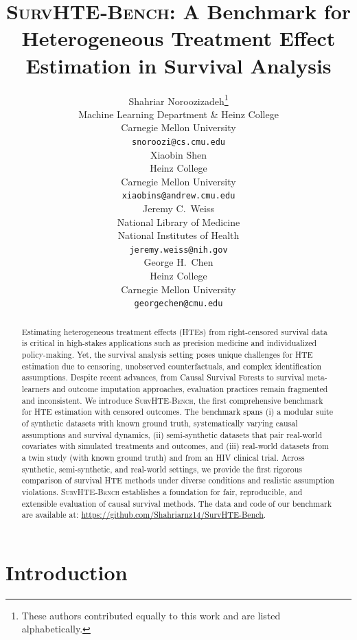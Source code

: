 \documentclass{article} %
\title{\textsc{SurvHTE‐Bench}: A Benchmark for \\ Heterogeneous Treatment Effect Estimation in Survival Analysis}
\author{Shahriar Noroozizadeh\thanks{These authors contributed equally to this work and are listed alphabetically.} \\
Machine Learning Department \& Heinz College \\
Carnegie Mellon University\\
\texttt{snoroozi@cs.cmu.edu} \\
\And
\hspace{-13.56em}Xiaobin Shen\footnotemark[1] \\
\hspace{-13.56em}Heinz College \\
\hspace{-13.56em}Carnegie Mellon University \\
\hspace{-13.56em}\texttt{xiaobins@andrew.cmu.edu}\\
\AND
Jeremy C.~Weiss \\
National Library of Medicine \\
National Institutes of Health \\
\texttt{jeremy.weiss@nih.gov}\\
\And
\hspace{12em}George H.~Chen \\
\hspace{12em}Heinz College \\
\hspace{12em}Carnegie Mellon University \\
\hspace{12em}\texttt{georgechen@cmu.edu}
}
\begin{document}
\maketitle

\begin{abstract}
\vspace{-.5em}
Estimating heterogeneous treatment effects (HTEs) from right-censored survival data is critical in high-stakes applications such as precision medicine and individualized policy-making. Yet, the survival analysis setting poses unique challenges for HTE estimation due to censoring, unobserved counterfactuals, and complex identification assumptions. Despite recent advances, from Causal Survival Forests to survival meta-learners and outcome imputation approaches, evaluation practices remain fragmented and inconsistent. 
We introduce \textsc{SurvHTE‐Bench}, the first comprehensive benchmark for HTE estimation with censored outcomes. The benchmark spans (i) a modular suite of synthetic datasets with known ground truth, systematically varying causal assumptions and survival dynamics, 
(ii) semi-synthetic datasets that pair real-world covariates with simulated treatments and outcomes, and
(iii) real-world datasets from a twin study (with known ground truth) and from an HIV clinical trial.
Across synthetic, semi-synthetic, and real-world settings, we provide the first rigorous comparison of survival HTE methods under diverse conditions and realistic assumption violations. 
\textsc{SurvHTE‐Bench} establishes a foundation for fair, reproducible, and extensible evaluation of causal survival methods. The data and code of our benchmark are available at: \url{https://github.com/Shahriarnz14/SurvHTE-Bench}.
\end{abstract}
\vspace{-1em}

\section{Introduction}
\label{sec:intro}
\vspace{-.8em}
\end{document}
